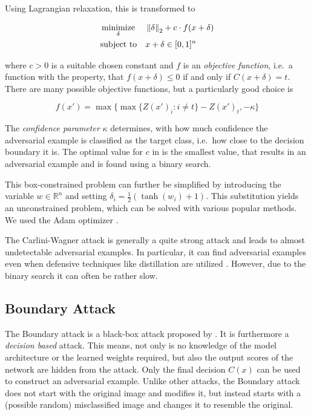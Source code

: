 Using Lagrangian relaxation, this is transformed to

\begin{equation}
\label{eq:cwproblem}
\begin{aligned}
& \operatorname*{minimize}_{\delta} && \left \lVert \delta \right \rVert _{2} + c \cdot f(x + \delta)\\
& \text{subject to} && x + \delta \in [0,1]^n
\end{aligned}
\end{equation}

where $c > 0$ is a suitable chosen constant and $f$ is an \emph{objective function}, i.e.\ a function with the property, that
$f(x + \delta) \leq 0$ if and only if $C(x + \delta) = t$.
There are many possible objective functions, but a particularly good choice is

\begin{equation}
\label{eq:cwobjective}
f(x') = \max \{ \max \{Z(x')_i : i \neq t \} - Z(x')_t, -\kappa \}
\end{equation}

The \emph{confidence parameter} $\kappa$ determines, with how much confidence the adversarial example is classified as the target class, i.e.\ how close to the decision boundary it is.
The optimal value for $c$ in  is the smallest value, that results in an adversarial example and is found using a binary search.

This box-constrained problem can further be simplified by introducing the variable $w \in \mathbb{R}^n$ and setting $\delta_i = \frac{1}{2} (\tanh(w_i) + 1)$.
This substitution yields an unconstrained problem, which can be solved with various popular methods. We used the Adam optimizer \citep{adam}.

The Carlini-Wagner attack is generally a quite strong attack and leads to almost undetectable adversarial examples.
In particular, it can find adversarial examples even when defensive techniques like distillation are utilized \citep{carlini}.
However, due to the binary search it can often be rather slow.

\subsection{Boundary Attack}

The Boundary attack is a black-box attack proposed by \citet{boundary}. It is furthermore a \emph{decision based} attack. This means, not only is no knowledge of the model architecture or the learned weights required, but also the output scores of the network are hidden from the attack. Only the final decision $C(x)$ can be used to construct an adversarial example.
Unlike other attacks, the Boundary attack does not start with the original image and modifies it, but instead starts with a (possible random) misclassified image and changes it to resemble the original.


